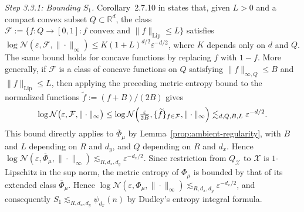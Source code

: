 \documentclass[11pt]{amsart}
\theoremstyle{definition}
\theoremstyle{remark}
\newcommand{\1}{\mathbf{1}}
\newcommand{\Lip}{\operatorname{Lip}}
\numberwithin{equation}{section}
\begin{document}
\emph{Step 3.3.1: Bounding $S_1$.}
Corollary~2.7.10 in \cite{VanDerVaartWellner1996} states that, given $L>0$
and a compact convex subset $Q\subset\mathbb{R}^d$, the class
$\mathcal{F} := \{ f:Q\to[0,1] : f \text{ convex and }
\|f\|_{\Lip}\le L \}$ satisfies
$\log \mathcal N(\varepsilon,\mathcal{F},\|\cdot\|_\infty)
\le K(1+L)^{d/2}\varepsilon^{-d/2}$, where $K$ depends only on $d$ and
$Q$. The same bound holds for concave functions by replacing $f$ with
$1-f$. More generally, if $\mathcal{F}$ is a class of concave functions on
$Q$ satisfying $\|f\|_{\infty,Q}\le B$ and
$\|f\|_{\Lip}\le L$, then applying the preceding metric entropy bound to
the normalized functions $\widetilde{f} := (f+B)/(2B)$ gives
\begin{align}\label{eq:metric entropy conc}
  \log \mathcal N\bigl(\varepsilon,\mathcal{F},\|\cdot\|_\infty\bigr)
    \le \log \mathcal N\Bigl(\tfrac{\varepsilon}{2B},
    \{\widetilde{f}\}_{f\in \mathcal{F}},\|\cdot\|_\infty\Bigr)
    \lesssim_{d,Q,B,L} \varepsilon^{-d/2}.
\end{align}
This bound directly applies to $\overline{\Phi}_\mu$ by
Lemma~\ref{prop:ambient-regularity}, with $B$ and $L$ depending on $R$ and
$d_y$, and $Q$ depending on $R$ and $d_x$. Hence
$\log \mathcal N(\varepsilon, \overline{\Phi}_\mu, \|\cdot\|_\infty)
\lesssim_{R,d_x,d_y} \varepsilon^{-d_x/2}$. Since restriction from
$Q_\mathcal{X}$ to $\mathcal X$ is $1$-Lipschitz in the sup norm, the
metric entropy of $\Phi_\mu$ is bounded by that of its extended class
$\overline{\Phi}_\mu$. Hence
$\log \mathcal N(\varepsilon, \Phi_\mu, \|\cdot\|_\infty)
\lesssim_{R,d_x,d_y} \varepsilon^{-d_x/2}$, and consequently
$S_1 \lesssim_{R,d_x,d_y} \psi_{d_x}(n)$ by Dudley's entropy integral formula.
\end{document}
